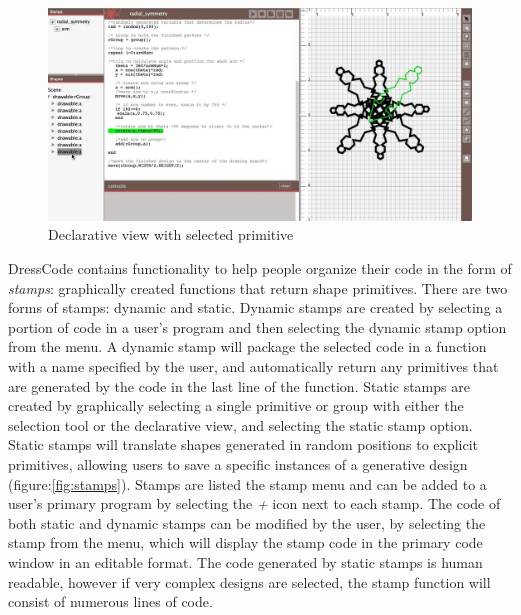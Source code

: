 \documentclass{sigchi}
\begin{document}
\begin{center}
\begin{figure}[h!]
\includegraphics[width=\columnwidth]{images/selection_mechanism.jpg}
\caption{Declarative view with selected primitive}
\label{fig:declarative view}
\end{figure}
\end{center}
\vspace{-20pt}

DressCode contains functionality to help people organize their code in the form of \textit{stamps}: graphically created functions that return shape primitives. There are two forms of stamps: dynamic and static. Dynamic stamps are created by selecting a portion of code in a user's program and then selecting the dynamic stamp option from the menu. A dynamic stamp will package the selected code in a function with a name specified by the user, and automatically return any primitives that are generated by the code in the last line of the function. Static stamps are created by graphically selecting a single primitive or group with either the selection tool or the declarative view, and selecting the static stamp option. Static stamps will translate shapes generated in random positions to explicit primitives, allowing users to save a specific instances of a generative design (figure:\ref{fig:stamps}).  Stamps are listed the stamp menu and can be added to a user's primary program by selecting the \textit{+} icon next to each stamp. The code of both static and dynamic stamps can be modified by the user, by selecting the stamp from the menu, which will display the stamp code in the primary code window in an editable format. The code generated by static stamps is human readable, however if very complex designs are selected, the stamp function will consist of numerous lines of code.
\end{document}
